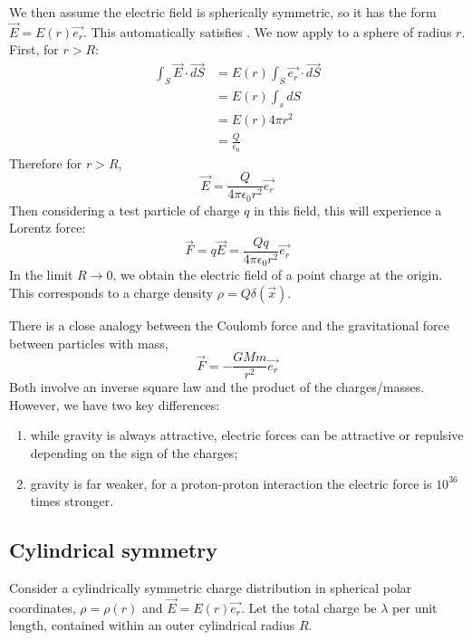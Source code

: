 \documentclass[../Main.tex]{subfiles}
\begin{document}
We then assume the electric field is spherically symmetric, so it has the form $\vec{E} = E(r) \vec{e_r}$. This automatically satisfies . We now apply  to a sphere of radius $r$. First, for $r > R$:
\begin{align*}
    \int_S \vec{E} \cdot \vec{dS} &= E(r) \int_S \vec{e_r} \cdot \vec{dS} \\
    &= E(r) \int_s dS \\
    &= E(r) 4\pi r^2 \\
    &= \frac{Q}{\epsilon_0}
\end{align*}
Therefore for $r > R$,
\begin{equation*}
    \vec{E} = \frac{Q}{4\pi \epsilon_0 r^2} \vec{e_r}
\end{equation*}
Then considering a test particle of charge $q$ in this field, this will experience a Lorentz force:
\begin{equation*}
    \vec{F} = q\vec{E} = \frac{Qq}{4\pi \epsilon_0 r^2} \vec{e_r}
\end{equation*}
In the limit $R \to 0$, we obtain the electric field of a point charge at the origin. This corresponds to a charge density $\rho = Q \delta(\vec{x})$.

\begin{remark}
    There is a close analogy between the Coulomb force and the gravitational force between particles with mass,
    \begin{equation*}
        \vec{F} = -\frac{GMm}{r^2} \vec{e_r}
    \end{equation*}
    Both involve an inverse square law and the product of the charges/masses. However, we have two key differences:
    \begin{enumerate}
        \item while gravity is always attractive, electric forces can be attractive or repulsive depending on the sign of the charges;
        \item gravity is far weaker, for a proton-proton interaction the electric force is $10^{36}$ times stronger.
    \end{enumerate}
\end{remark}
\subsection{Cylindrical symmetry}
Consider a cylindrically symmetric charge distribution in spherical polar coordinates, $\rho = \rho(r)$ and $\vec{E} = E(r) \vec{e_r}$. Let the total charge be $\lambda$ per unit length, contained within an outer cylindrical radius $R$.
\end{document}

